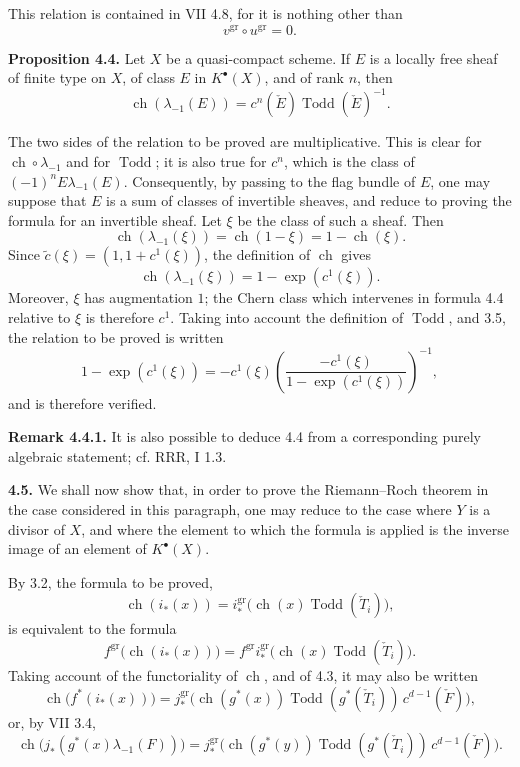 \documentclass[11pt]{article}
\newcommand{\ch}{\operatorname{ch}}
\newcommand{\Todd}{\operatorname{Todd}}
\newcommand{\RRR}{\mathrm{RRR}}
\providecommand{\ch}{\operatorname{ch}}
\providecommand{\Todd}{\operatorname{Todd}}
\begin{document}
This relation is contained in VII 4.8, for it is nothing other than
\[
 v^{\mathrm{gr}}\circ u^{\mathrm{gr}}=0 .
\]

\textbf{Proposition 4.4.} Let \(X\) be a quasi-compact scheme. If \(E\) is a locally free sheaf of finite type on \(X\), of class \(E\) in \(K^{\bullet}(X)\), and of rank \(n\), then
\[
 \ch(\lambda_{-1}(E))=c^n(\check E)\Todd(\check E)^{-1}.
\]

The two sides of the relation to be proved are multiplicative. This is clear for \(\ch\circ\lambda_{-1}\) and for \(\Todd\); it is also true for \(c^n\), which is the class of \((-1)^nE\lambda_{-1}(E)\). Consequently, by passing to the flag bundle of \(E\), one may suppose that \(E\) is a sum of classes of invertible sheaves, and reduce to proving the formula for an invertible sheaf. Let \(\xi\) be the class of such a sheaf. Then
\[
 \ch(\lambda_{-1}(\xi))=\ch(1-\xi)=1-\ch(\xi).
\]
Since \(\widetilde c(\xi)=(1,1+c^1(\xi))\), the definition of \(\ch\) gives
\[
 \ch(\lambda_{-1}(\xi))=1-\exp(c^1(\xi)).
\]
Moreover, \(\xi\) has augmentation \(1\); the Chern class which intervenes in formula 4.4 relative to \(\xi\) is therefore \(c^1\). Taking into account the definition of \(\Todd\), and 3.5, the relation to be proved is written
\[
 1-\exp(c^1(\xi))
 =
 -c^1(\xi)\left(\frac{-c^1(\xi)}{1-\exp(c^1(\xi))}\right)^{-1},
\]
and is therefore verified.

\textbf{Remark 4.4.1.} It is also possible to deduce 4.4 from a corresponding purely algebraic statement; cf. \(\RRR\), I 1.3.

\textbf{4.5.} We shall now show that, in order to prove the Riemann--Roch theorem in the case considered in this paragraph, one may reduce to the case where \(Y\) is a divisor of \(X\), and where the element to which the formula is applied is the inverse image of an element of \(K^{\bullet}(X)\).

By 3.2, the formula to be proved,
\[
 \ch(i_*(x))=
 i^{\mathrm{gr}}_*\bigl(\ch(x)\Todd(\check T_i)\bigr),
\]
is equivalent to the formula
\[
 f^{\mathrm{gr}}\bigl(\ch(i_*(x))\bigr)
 =
 f^{\mathrm{gr}}i^{\mathrm{gr}}_*\bigl(\ch(x)\Todd(\check T_i)\bigr).
\]
Taking account of the functoriality of \(\ch\), and of 4.3, it may also be written
\[
 \ch\bigl(f^*(i_*(x))\bigr)
 =
 j^{\mathrm{gr}}_*\bigl(\ch(g^*(x))\Todd(g^*(\check T_i))\,c^{d-1}(\check F)\bigr),
\]
or, by VII 3.4,
\[
 \ch\bigl(j_*(g^*(x)\lambda_{-1}(F))\bigr)
 =
 j^{\mathrm{gr}}_*\bigl(\ch(g^*(y))\Todd(g^*(\check T_i))\,c^{d-1}(\check F)\bigr).
\]
\end{document}
